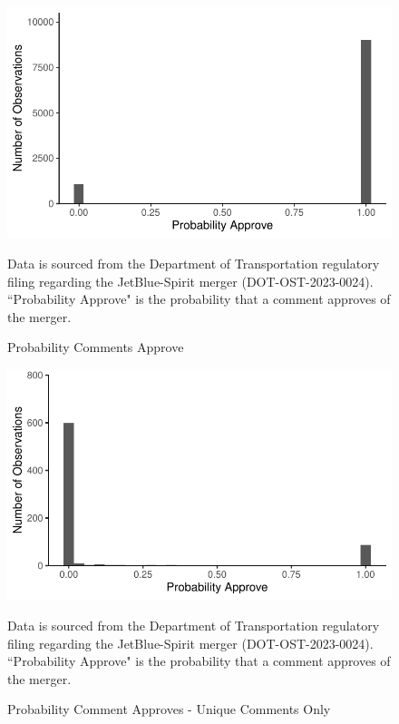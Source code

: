 \documentclass{article}
\begin{document}
\begin{appendices}
	\begin{figure}
		\caption{Probability Comments Approve}
		\label{fig:ProbabilityApprove}
        \begin{center}
        \includegraphics{05.Figures/stance_strength_graph}
        \end{center}
		\begin{minipage}{\textwidth} 
			{\footnotesize Data is sourced from the Department of Transportation regulatory filing regarding the JetBlue-Spirit merger (DOT-OST-2023-0024). ``Probability Approve" is the probability that a comment approves of the merger.} 
		\end{minipage}
	\end{figure}
	
	\begin{figure}
		\caption{Probability Comment Approves - Unique Comments Only}
		\label{fig:ProbabilityApprove_Unique}
        \begin{center}
            \includegraphics{05.Figures/stance_strength_unique.pdf}
        \end{center}
				\begin{minipage}{\textwidth} 
			{\footnotesize Data is sourced from the Department of Transportation regulatory filing regarding the JetBlue-Spirit merger (DOT-OST-2023-0024). ``Probability Approve" is the probability that a comment approves of the merger.} 
		\end{minipage}
	\end{figure}



\end{appendices}
\end{document}
